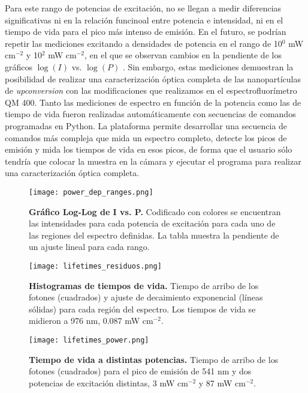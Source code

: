 Para este rango de potencias de excitación, no se llegan a medir diferencias significativas ni en la relación funcinoal entre potencia e intensidad, ni en el tiempo de vida para el pico más intenso de emisión.
En el futuro, se podrían repetir las mediciones excitando a densidades de potencia en el rango de 10$^0$ mW cm$^{-2}$ y 10$^2$ mW cm$^{-2}$, en el que se observan cambios en la pendiente de los gráficos $\log(I)$ vs. $\log(P)$ \cite{bujjamer_luminescent_2020}.
Sin embargo, estas mediciones demuestran la posibilidad de realizar una caracterización óptica completa de las nanopartículas de \textit{upconversion} con las modificaciones que realizamos en el espectrofluorímetro QM 400.
Tanto las mediciones de espectro en función de la potencia como las de tiempo de vida fueron realizadas automáticamente con secuencias de comandos programadas en Python.
La plataforma permite desarrollar una secuencia de comandos más compleja que mida un espectro completo, detecte los picos de emisión y mida los tiempos de vida en esos picos, de forma que el usuario sólo tendría que colocar la muestra en la cámara y ejecutar el programa para realizar una caracterización óptica completa.

\begin{figure}
    \centering
    \texttt{[image: power\_dep\_ranges.png]}
    \caption{\textbf{Gráfico Log-Log de I vs. P.} Codificado con colores se encuentran las intensidades para cada potencia de excitación para cada uno de las regiones del espectro definidas. La tabla muestra la pendiente de un ajuste lineal para cada rango.}
    \label{fig:power_dep_ranges}
\end{figure}


\begin{figure}
    \centering
    \texttt{[image: lifetimes\_residuos.png]}
    \caption{\textbf{Histogramas de tiempos de vida.} Tiempo de arribo de los fotones (cuadrados) y ajuste de decaimiento exponencial (líneas sólidas) para cada región del espectro. Los tiempos de vida se midieron a 976 nm, 0.087 mW cm$^{-2}$.}
    \label{fig:lifetimes}
\end{figure}

\begin{SCfigure}
    \centering
    \texttt{[image: lifetimes\_power.png]}
    \caption{\textbf{Tiempo de vida a distintas potencias.} Tiempo de arribo de los fotones (cuadrados) para el pico de emisión de 541 nm y dos potencias de excitación distintas, 3 mW cm$^{-2}$ y 87 mW cm$^{-2}$.}
    \label{fig:lifetimes_power}
\end{SCfigure}
